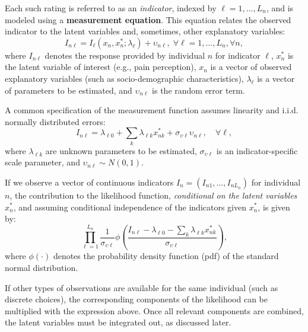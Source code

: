\documentclass[12pt,a4paper]{article}
\begin{document}
Each such rating is referred to as an \emph{indicator}, indexed by
$\ell=1, \ldots, L_n$, and is modeled using a \textbf{measurement
  equation}. This equation relates the observed indicator to the
latent variables and, sometimes, other explanatory variables:
\begin{equation}
\label{eq:continuousMeasurement}
I_{n\ell} = I_\ell(x_n, x_n^*;\lambda_\ell) + \upsilon_{n\ell}, \;
\forall \ell=1, \ldots, L_n, \forall n,
\end{equation}
where $I_{n\ell}$ denotes the response provided by individual $n$ for
indicator $\ell$, $x_n^*$ is the latent variable of interest (e.g.,
pain perception), $x_n$ is a vector of observed explanatory variables
(such as socio-demographic characteristics), $\lambda_\ell$ is a
vector of parameters to be estimated, and $\upsilon_{n\ell}$ is the
random error term.

A common specification of the measurement function assumes linearity
and i.i.d. normally distributed errors:
\begin{equation}
\label{eq:linearMeasurement}
I_{n\ell} = \lambda_{\ell 0} + \sum_k \lambda_{\ell k} x_{nk}^* +
\sigma_{\upsilon \ell} \upsilon_{n\ell}, \quad \forall \ell,
\end{equation}
where $\lambda_{\ell k}$ are unknown parameters to be estimated,
$\sigma_{\upsilon \ell}$ is an indicator-specific scale parameter, and
$\upsilon_{n\ell} \sim N(0, 1)$.

If we observe a vector of continuous indicators \( I_n = (I_{n1},
\ldots, I_{nL_n}) \) for individual \( n \), the contribution to the
likelihood function, \emph{conditional on the latent variables} \(
x_n^* \), and assuming conditional independence of the indicators
given \( x_n^* \), is given by:
\begin{equation}
  \label{eq:conditional_likelihood_continuous}
  \prod_{\ell=1}^{L_n}
  \frac{1}{\sigma_{\upsilon \ell}}
  \phi\left(
  \frac{I_{n\ell} - \lambda_{\ell 0}
  - \sum_k \lambda_{\ell k} x_{nk}^*}
  {\sigma_{\upsilon \ell}}
  \right),
\end{equation}
where \( \phi(\cdot) \) denotes the probability density function (pdf)
of the standard normal distribution.

If other types of observations are available for the same individual
(such as discrete choices), the corresponding components of the
likelihood can be multiplied with the expression above. Once all
relevant components are combined, the latent variables must be
integrated out, as discussed later.
\end{document}
